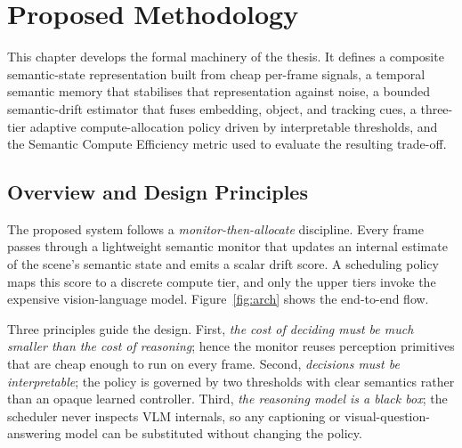 \chapter{Proposed Methodology}
\label{ch:methods}

\begin{chapterabstract}
This chapter develops the formal machinery of the thesis. It defines a
composite semantic-state representation built from cheap per-frame signals, a
temporal semantic memory that stabilises that representation against noise, a
bounded semantic-drift estimator that fuses embedding, object, and tracking
cues, a three-tier adaptive compute-allocation policy driven by interpretable
thresholds, and the Semantic Compute Efficiency metric used to evaluate the
resulting trade-off.
\end{chapterabstract}

\section{Overview and Design Principles}
\label{sec:meth-overview}

The proposed system follows a \emph{monitor-then-allocate} discipline. Every
frame passes through a lightweight semantic monitor that updates an internal
estimate of the scene's semantic state and emits a scalar drift score. A
scheduling policy maps this score to a discrete compute tier, and only the
upper tiers invoke the expensive vision-language model. Figure~\ref{fig:arch}
shows the end-to-end flow.

Three principles guide the design. First, \emph{the cost of deciding must be
much smaller than the cost of reasoning}; hence the monitor reuses
perception primitives that are cheap enough to run on every frame. Second,
\emph{decisions must be interpretable}; the policy is governed by two
thresholds with clear semantics rather than an opaque learned controller.
Third, \emph{the reasoning model is a black box}; the scheduler never inspects
VLM internals, so any captioning or visual-question-answering model can be
substituted without changing the policy.

